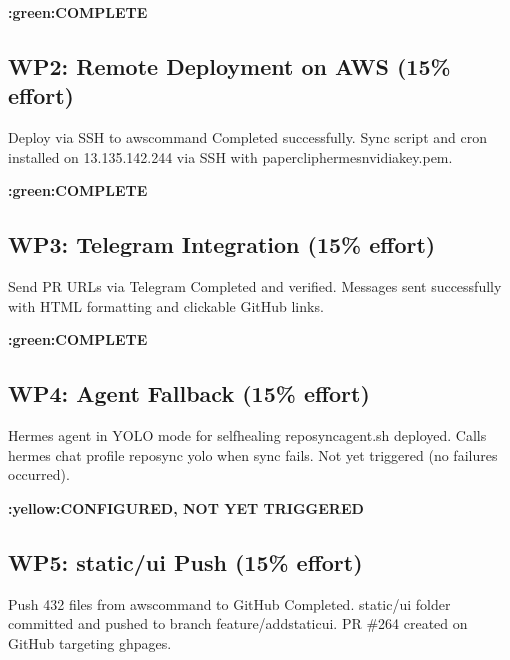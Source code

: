 \documentclass[letterpaper,10pt,openany,oneside,english]{sphinxmanual}
\begin{document}
\sphinxAtStartPar
{} {\color{red}\bfseries{}:green:\textasciigrave{}COMPLETE\textasciigrave{}}


\subsection{WP2: Remote Deployment on AWS (15\% effort)}
\label{\detokenize{outcomes_vs_plan:wp2-remote-deployment-on-aws-15-effort}}
\sphinxAtStartPar
{} Deploy via SSH to aws\sphinxhyphen{}command
 Completed successfully. Sync script and cron installed on
13.135.142.244 via SSH with paperclip\sphinxhyphen{}hermes\sphinxhyphen{}nvidia\sphinxhyphen{}key.pem.

\sphinxAtStartPar
{} {\color{red}\bfseries{}:green:\textasciigrave{}COMPLETE\textasciigrave{}}


\subsection{WP3: Telegram Integration (15\% effort)}
\label{\detokenize{outcomes_vs_plan:wp3-telegram-integration-15-effort}}
\sphinxAtStartPar
{} Send PR URLs via Telegram
 Completed and verified. Messages sent successfully with HTML
formatting and clickable GitHub links.

\sphinxAtStartPar
{} {\color{red}\bfseries{}:green:\textasciigrave{}COMPLETE\textasciigrave{}}


\subsection{WP4: Agent Fallback (15\% effort)}
\label{\detokenize{outcomes_vs_plan:wp4-agent-fallback-15-effort}}
\sphinxAtStartPar
{} Hermes agent in YOLO mode for self\sphinxhyphen{}healing
 repo\sphinxhyphen{}sync\sphinxhyphen{}agent.sh deployed. Calls hermes chat \textendash{}profile reposync
\textendash{}yolo when sync fails. Not yet triggered (no failures occurred).

\sphinxAtStartPar
{} {\color{red}\bfseries{}:yellow:\textasciigrave{}CONFIGURED, NOT YET TRIGGERED\textasciigrave{}}


\subsection{WP5: static/ui Push (15\% effort)}
\label{\detokenize{outcomes_vs_plan:wp5-static-ui-push-15-effort}}
\sphinxAtStartPar
{} Push 432 files from aws\sphinxhyphen{}command to GitHub
 Completed. static/ui folder committed and pushed to branch
feature/add\sphinxhyphen{}static\sphinxhyphen{}ui. PR \#264 created on GitHub targeting gh\sphinxhyphen{}pages.
\end{document}
